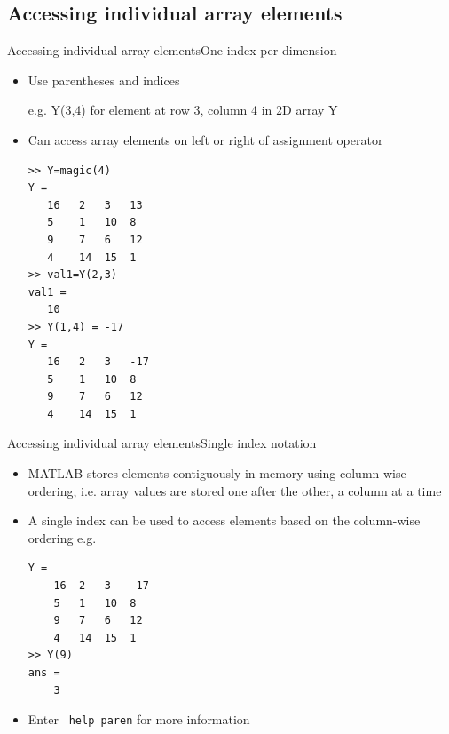\documentclass{beamer}
\begin{document}
\subsection{Accessing individual array elements}
\begin{frame}[fragile]{Accessing individual array elements}{One index per dimension}
	\begin{itemize}
		\item Use parentheses and indices
		
		e.g. Y(3,4) for element at row 3, column 4 in 2D array Y
		\item Can access array elements on left or right of assignment operator
		
		\begin{lstlisting}[style=Matlab-editor,basicstyle=\footnotesize]
>> Y=magic(4)
Y = 
   16	2	3	13
   5	1	10	8
   9	7	6	12
   4	14	15	1
>> val1=Y(2,3)	
val1 = 
   10
>> Y(1,4) = -17
Y = 
   16	2	3	-17
   5	1	10	8
   9	7	6	12
   4	14	15	1
		\end{lstlisting}	
		
	\end{itemize}
\end{frame}

\begin{frame}[fragile]{Accessing individual array elements}{Single index notation}
	\begin{itemize}
		\item MATLAB stores elements contiguously in memory using column-wise ordering, i.e. array values are stored one after the other, a column at a time
		\item A single index can be used to access elements based on the column-wise ordering e.g.
		
		\begin{lstlisting}[style=Matlab-editor,basicstyle=\small]
Y = 
	16	2	3	-17
	5	1	10	8
	9	7	6	12
	4	14	15	1
>> Y(9)
ans = 
	3   
		\end{lstlisting}
		\item Enter \texttt{ help paren} for more information
	\end{itemize}
\end{frame}
\end{document}
